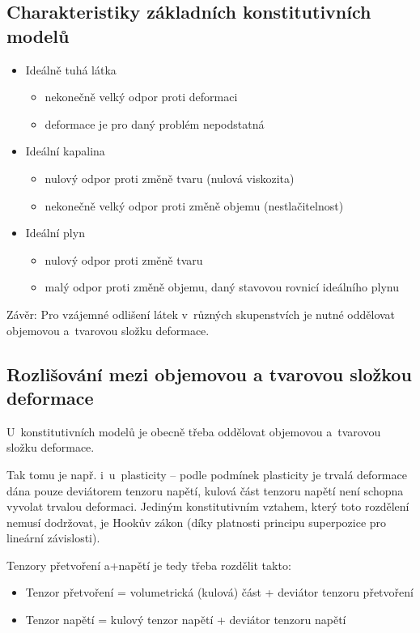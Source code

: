 \subsection{Charakteristiky základních konstitutivních modelů}
\begin{itemize}
	\item Ideálně tuhá látka
	\begin{itemize}
		\item nekonečně velký odpor proti deformaci
		\item deformace je pro daný problém nepodstatná
	\end{itemize}
	\item Ideální kapalina
	\begin{itemize}
		\item nulový odpor proti změně tvaru (nulová viskozita)
		\item nekonečně velký odpor proti změně objemu (nestlačitelnost)
	\end{itemize}
	\item Ideální plyn
	\begin{itemize}
		\item nulový odpor proti změně tvaru
		\item malý odpor proti změně objemu, daný stavovou rovnicí ideálního plynu
	\end{itemize}
\end{itemize}

Závěr: Pro vzájemné odlišení látek v~různých skupenstvích je nutné oddělovat objemovou a~tvarovou složku deformace.

\subsection{Rozlišování mezi objemovou a tvarovou složkou deformace}
U~konstitutivních modelů je obecně třeba oddělovat objemovou a~tvarovou složku deformace.

Tak tomu je např. i~u~plasticity -- podle podmínek plasticity je trvalá deformace dána pouze deviátorem tenzoru napětí, kulová část tenzoru napětí není schopna vyvolat trvalou deformaci.
Jediným konstitutivním vztahem, který toto rozdělení nemusí dodržovat, je Hookův zákon (díky platnosti principu superpozice pro lineární závislosti).

Tenzory přetvoření a+napětí je tedy třeba rozdělit takto:
\begin{itemize}
	\item Tenzor přetvoření = volumetrická (kulová) část + deviátor tenzoru přetvoření
	\item Tenzor napětí = kulový tenzor napětí + deviátor tenzoru napětí
\end{itemize}

